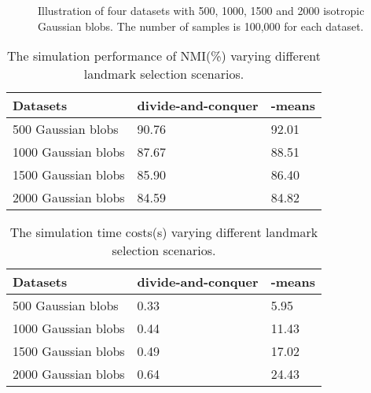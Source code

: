 \begin{figure}\begin{center}
    {}
    {}
    {}
    {}
    \caption{Illustration of four datasets with 500, 1000, 1500 and 2000 isotropic Gaussian blobs. The number of samples is 100,000 for each dataset.}
    \label{fig:simulation_landmarks}
  \end{center}
\end{figure}

\begin{table}[]
    \centering
    \caption{The simulation performance of NMI(\%) varying different landmark selection scenarios.}
    \label{tab:simulation_landmark_NMI}
    \begin{tabular}{@{}lll@{}}
    \toprule
    Datasets & divide-and-conquer                 & -means            \\ \midrule
    500 Gaussian blobs             & 90.76 & 92.01 \\
    1000 Gaussian blobs            & 87.67 & 88.51 \\
    1500 Gaussian blobs            & 85.90 & 86.40 \\
    2000 Gaussian blobs            & 84.59  & 84.82  \\ \bottomrule
    \end{tabular}
    \end{table}
    
    
    \begin{table}[]
    \centering
    \caption{The simulation time costs(s) varying different landmark selection scenarios.}
    \label{tab:simulation_landmark_time}
    \begin{tabular}{@{}lll@{}}
    \toprule
    Datasets & divide-and-conquer               & -means            \\ \midrule
    500 Gaussian blobs             & 0.33 & 5.95  \\
    1000 Gaussian blobs            & 0.44 & 11.43 \\
    1500 Gaussian blobs            & 0.49 & 17.02 \\
    2000 Gaussian blobs            & 0.64 & 24.43 \\ \bottomrule
    \end{tabular}
    \end{table}







